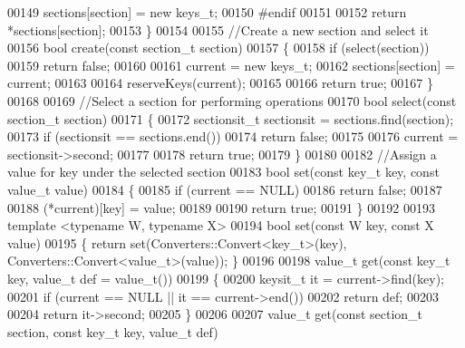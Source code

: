\begin{DoxyCode}
00149        sections[section] = \textcolor{keyword}{new} keys\_t;
00150 \textcolor{preprocessor}{   #endif}
00151 
00152       \textcolor{keywordflow}{return} *sections[section];
00153    \}
00154 
00155    \textcolor{comment}{//Create a new section and select it}
00156    \textcolor{keywordtype}{bool} create(\textcolor{keyword}{const} section\_t section)
00157    \{
00158       \textcolor{keywordflow}{if} (select(section))
00159          \textcolor{keywordflow}{return} \textcolor{keyword}{false};
00160 
00161       current = \textcolor{keyword}{new} keys\_t;
00162       sections[section] = current;
00163 
00164       reserveKeys(current);
00165 
00166       \textcolor{keywordflow}{return} \textcolor{keyword}{true};
00167    \}
00168 
00169    \textcolor{comment}{//Select a section for performing operations}
00170    \textcolor{keywordtype}{bool} select(\textcolor{keyword}{const} section\_t section)
00171    \{
00172       sectionsit\_t sectionsit = sections.find(section);
00173       \textcolor{keywordflow}{if} (sectionsit == sections.end())
00174          \textcolor{keywordflow}{return} \textcolor{keyword}{false};
00175 
00176       current = sectionsit->second;
00177 
00178       \textcolor{keywordflow}{return} \textcolor{keyword}{true};
00179    \}
00180 
00182    \textcolor{comment}{//Assign a value for key under the selected section}
00183    \textcolor{keywordtype}{bool} \textcolor{keyword}{set}(\textcolor{keyword}{const} key\_t key, \textcolor{keyword}{const} value\_t value)
00184    \{
00185       \textcolor{keywordflow}{if} (current == NULL)
00186          \textcolor{keywordflow}{return} \textcolor{keyword}{false};
00187 
00188       (*current)[key] = value;
00189 
00190       \textcolor{keywordflow}{return} \textcolor{keyword}{true};
00191    \}
00192 
00193    \textcolor{keyword}{template} <\textcolor{keyword}{typename} W, \textcolor{keyword}{typename} X>
00194       \textcolor{keywordtype}{bool} \textcolor{keyword}{set}(\textcolor{keyword}{const} W key, \textcolor{keyword}{const} X value)
00195          \{ \textcolor{keywordflow}{return} \textcolor{keyword}{set}(Converters::Convert<key\_t>(key), Converters::Convert<value\_t>(value)); \}
00196 
00198    value\_t \textcolor{keyword}{get}(\textcolor{keyword}{const} key\_t key, value\_t def = value\_t())
00199    \{
00200       keysit\_t it = current->find(key);
00201       \textcolor{keywordflow}{if} (current == NULL || it == current->end())
00202          \textcolor{keywordflow}{return} def;
00203 
00204       \textcolor{keywordflow}{return} it->second;
00205    \}
00206 
00207    value\_t \textcolor{keyword}{get}(\textcolor{keyword}{const} section\_t section, \textcolor{keyword}{const} key\_t key, value\_t def)

\end{DoxyCode}
